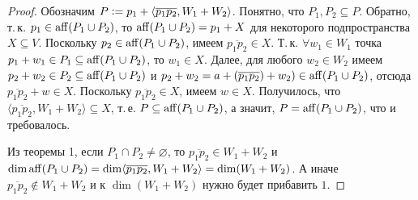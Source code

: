 \begin{proof}
    Обозначим $P \vcentcolon = p_1 + \langle\overline{p_1p_2}, W_1 + W_2\rangle$. Понятно, что $P_1, P_2 \subseteq P$. Обратно, т.\,к. $p_1 \in \operatorname{aff}(P_1 \cup P_2)$, то $\operatorname{aff}(P_1 \cup P_2) = p_1 + X$ для некоторого подпространства $X \subseteq V$. Поскольку $p_2 \in \operatorname{aff}(P_1 \cup P_2)$, имеем $\overline{p_1p_2} \in X$. Т.\,к. $\forall w_1 \in W_1$ точка $p_1 + w_1 \in P_1 \subseteq \operatorname{aff}(P_1 \cup P_2)$, то $w_1 \in X$. Далее, для любого $w_2 \in W_2$ имеем $p_2 + w_2 \in P_2 \subseteq \operatorname{aff}(P_1 \cup P_2)$ и $p_2 + w_2 = a + (\overline{p_1p_2}) + w_2) \in \operatorname{aff}(P_1 \cup P_2)$, отсюда $\overline{p_1p_2} + w \in X$. Поскольку $\overline{p_1p_2} \in X$, имеем $w \in X$. Получилось, что $\langle\overline{p_1p_2}, W_1 + W_2\rangle \subseteq X$, т.\,е. $P \subseteq \operatorname{aff}(P_1 \cup P_2)$, а значит, $P = \operatorname{aff}(P_1 \cup P_2)$, что и требовалось.

    Из теоремы 1, если $P_1 \cap P_2 \ne \varnothing$, то $\overline{p_1p_2} \in W_1 + W_2$ и $\dim\operatorname{aff}(P_1 \cup P_2) = \dim\langle\overline{p_1p_2}, W_1 + W_2\rangle = \dim(W_1 + W_2)$. А иначе $\overline{p_1p_2} \notin W_1 + W_2$ и к $\dim(W_1 + W_2)$ нужно будет прибавить $1$.
\end{proof}

